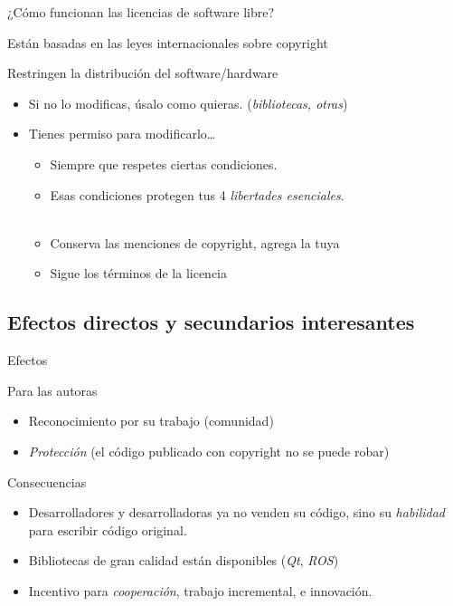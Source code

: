   \begin{frame}{¿Cómo funcionan las licencias de software libre?}
    \begin{block}{Están basadas en las leyes internacionales sobre \alert{copyright}}
    \end{block}
    \begin{block}{Restringen la distribución del software/hardware}
      \begin{itemize}
        \item Si no lo modificas, úsalo como quieras. (\emph{bibliotecas, otras})
        \item Tienes permiso para modificarlo\dots
          \begin{itemize}
            \item Siempre que respetes ciertas condiciones.
            \item Esas condiciones protegen tus 4 \emph{libertades esenciales}.\\~\\
            \item Conserva las menciones de copyright, agrega la tuya
            \item Sigue los términos de la licencia
         \end{itemize}
       \end{itemize}
    \end{block}
  \end{frame}

%
\subsection{Efectos directos y secundarios interesantes}

  \begin{frame}{Efectos}
    \begin{block}{Para las autoras}
      \begin{itemize}
        \item Reconocimiento por su trabajo (comunidad)
        \item \emph{Protección} (el código publicado con copyright no se puede robar)
      \end{itemize}
    \end{block}
    \begin{block}{Consecuencias}
      \begin{itemize}
        \item Desarrolladores y desarrolladoras ya no venden su código, sino su \emph{habilidad} para escribir código original.
        \item Bibliotecas de gran calidad están disponibles (\emph{Qt}, \emph{ROS})
        \item Incentivo para \emph{cooperación}, trabajo incremental, e \alert{innovación}.
      \end{itemize}
    \end{block}
  \end{frame}

